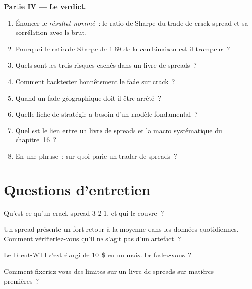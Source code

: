 \begin{problem}
\medskip\noindent\textbf{Partie IV --- Le verdict.}
\begin{enumerate}[resume]
\item Énoncer le \emph{résultat nommé}~: le ratio de Sharpe du trade de crack spread et sa corrélation avec le brut.
\item Pourquoi le ratio de Sharpe de 1.69 de la combinaison est-il trompeur~?
\item Quels sont les trois risques cachés dans un livre de spreads~?
\item Comment backtester honnêtement le fade sur crack~?
\item Quand un fade géographique doit-il être arrêté~?
\item Quelle fiche de stratégie a besoin d'un modèle fondamental~?
\item Quel est le lien entre un livre de spreads et la macro systématique du chapitre~16~?
\item En une phrase~: sur quoi parie un trader de spreads~?
\end{enumerate}
\end{problem}

\section{Questions d'entretien}

\begin{interviewq}\label{iq:s2:commodity-spreads:1}
Qu'est-ce qu'un crack spread 3-2-1, et qui le couvre~?
\end{interviewq}

\begin{interviewq}\label{iq:s2:commodity-spreads:2}
Un spread présente un fort retour à la moyenne dans les données quotidiennes. Comment vérifieriez-vous qu'il ne s'agit pas d'un artefact~?
\end{interviewq}

\begin{interviewq}\label{iq:s2:commodity-spreads:3}
Le Brent-WTI s'est élargi de 10~\$ en un mois. Le fadez-vous~?
\end{interviewq}

\begin{interviewq}\label{iq:s2:commodity-spreads:4}
Comment fixeriez-vous des limites sur un livre de spreads sur matières premières~?
\end{interviewq}

